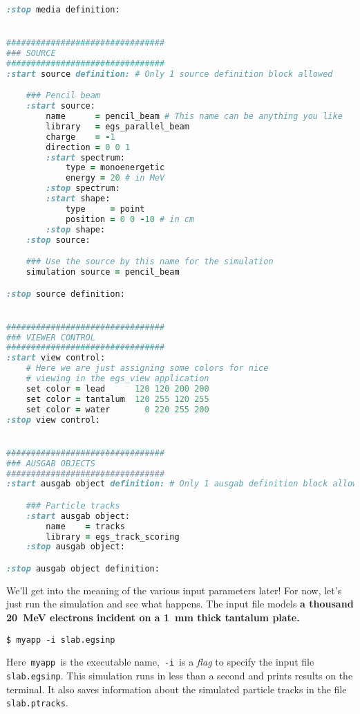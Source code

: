 \documentclass[12pt,twoside]{article}
\begin{document}
\begin{lstlisting}[language=ruby,backgroundcolor=\color{white}]
:stop media definition:


################################
### SOURCE
################################
:start source definition: # Only 1 source definition block allowed

    ### Pencil beam
    :start source:
        name      = pencil_beam # This name can be anything you like
        library   = egs_parallel_beam
        charge    = -1
        direction = 0 0 1
        :start spectrum:
            type = monoenergetic
            energy = 20 # in MeV
        :stop spectrum:
        :start shape:
            type     = point
            position = 0 0 -10 # in cm
        :stop shape:
    :stop source:

    ### Use the source by this name for the simulation
    simulation source = pencil_beam

:stop source definition:


################################
### VIEWER CONTROL
################################
:start view control:
    # Here we are just assigning some colors for nice
    # viewing in the egs_view application
    set color = lead      120 120 200 200
    set color = tantalum  120 255 120 255
    set color = water       0 220 255 200
:stop view control:


################################
### AUSGAB OBJECTS
################################
:start ausgab object definition: # Only 1 ausgab definition block allowed

    ### Particle tracks
    :start ausgab object:
        name    = tracks
        library = egs_track_scoring
    :stop ausgab object:

:stop ausgab object definition:
\end{lstlisting}

We'll get into the meaning of the various input parameters later! For now,
let's just run the simulation and see what happens. The input file models
\textbf{a thousand 20~MeV electrons incident on a 1~mm
thick tantalum plate.}

\begin{lstlisting}
$ myapp -i slab.egsinp
\end{lstlisting}

Here \,\Verb|myapp|\, is the executable name, \,\Verb|-i|\, is a
\textit{flag} to specify the input file \,\Verb|slab.egsinp|. This
simulation runs in less than a second and prints results on the
terminal. It also saves information about the simulated particle tracks
in the file \,\Verb|slab.ptracks|.
\end{document}

